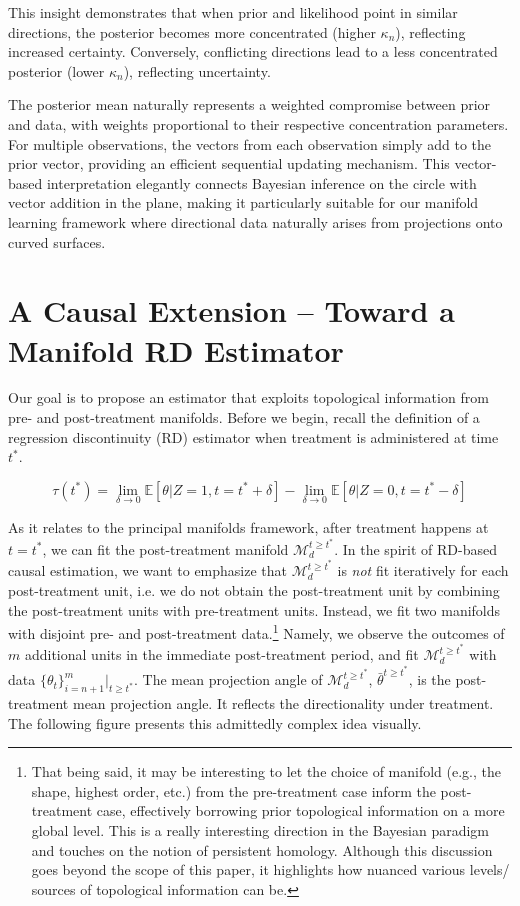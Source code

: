 \documentclass[twoside,11pt]{article}
\begin{document}
This insight demonstrates that when prior and likelihood point in similar directions, the posterior becomes more concentrated (higher $\kappa_n$), reflecting increased certainty. Conversely, conflicting directions lead to a less concentrated posterior (lower $\kappa_n$), reflecting uncertainty.

The posterior mean naturally represents a weighted compromise between prior and data, with weights proportional to their respective concentration parameters. For multiple observations, the vectors from each observation simply add to the prior vector, providing an efficient sequential updating mechanism. This vector-based interpretation elegantly connects Bayesian inference on the circle with vector addition in the plane, making it particularly suitable for our manifold learning framework where directional data naturally arises from projections onto curved surfaces.

\section{A Causal Extension -- Toward a Manifold RD Estimator}\label{sc:causal}

Our goal is to propose an estimator that exploits topological information from pre- and post-treatment manifolds. Before we begin, recall the definition of a regression discontinuity (RD) estimator when treatment is administered at time $t^*$. 

\[
  \tau(t^*) = \lim_{\delta \rightarrow 0} \mathbb{E}[\theta | Z = 1, t = t^* + \delta] - \lim_{\delta \rightarrow 0} \mathbb{E}[\theta | Z = 0, t = t^* - \delta] 
\]

As it relates to the principal manifolds framework, after treatment happens at $t=t^*$, we can fit the post-treatment manifold $\mathcal{M}_d^{t \geq t^*}$. In the spirit of RD-based causal estimation, we want to emphasize that $\mathcal{M}_d^{t \geq t^*}$ is \textit{not} fit iteratively for each post-treatment unit, i.e. we do not obtain the post-treatment unit by combining the post-treatment units with pre-treatment units. Instead, we fit two manifolds with disjoint pre- and post-treatment data.\footnote{That being said, it may be interesting to let the choice of manifold (e.g., the shape, highest order, etc.) from the pre-treatment case inform the post-treatment case, effectively borrowing prior topological information on a more global level. This is a really interesting direction in the Bayesian paradigm and touches on the notion of persistent homology. Although this discussion goes beyond the scope of this paper, it highlights how nuanced various levels/ sources of topological information can be.} Namely, we observe the outcomes of $m$ additional units in the immediate post-treatment period, and fit $\mathcal{M}_d^{t \geq t^*}$ with data $\{\theta_{t}\}_{i=n+1}^{m}|_{t \geq t^*}$. The mean projection angle of $\mathcal{M}_d^{t \geq t^*}$, $\bar{\theta}^{t \geq t^*}$, is the post-treatment mean projection angle. It reflects the directionality under treatment. The following figure presents this admittedly complex idea visually. 
\end{document}
